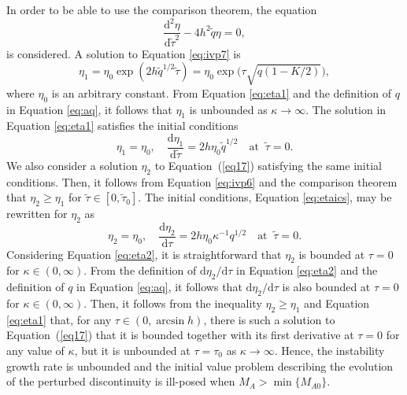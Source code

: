 In order to be able to use the comparison theorem, the equation
%
\begin{equation}
\label{eq:ivp7}
\frac{\mathrm{d}^2 \eta}{\mathrm{d}\tilde{\tau}^2} - 4h^2\tilde{q}\eta = 0, 
\end{equation}
%
is considered.
A solution to Equation \eqref{eq:ivp7} is
%
\begin{equation}
\label{eq:eta1}
\eta_1 = \eta_0\exp(2h\tilde{q}^{1/2}\tilde\tau) = 
\eta_0\exp\big(\tau\sqrt{q(1 - K/2)}\big),
\end{equation}
%
where $\eta_0$ is an arbitrary constant.
From Equation \eqref{eq:eta1} and the definition of $q$ in Equation \eqref{eq:aq}, it follows that $\eta_1$ is unbounded as $\kappa \to \infty$.
The solution in Equation \eqref{eq:eta1} satisfies the initial conditions
%
\begin{equation}
\label{eq:etaics}
\eta_1 = \eta_0, \quad \frac{\mathrm{d}\eta_1}{\mathrm{d}\tilde{\tau}} =
2h\eta_0\tilde{q}^{1/2} \quad \mbox{at} \;\; \tilde{\tau} = 0.
\end{equation}
%
We also consider a solution $\eta_2$ to Equation~(\ref{eq17}) satisfying the same initial conditions.
Then, it follows from Equation \eqref{eq:ivp6} and the comparison theorem that $\eta_2 \geq \eta_1$ for $\tilde{\tau} \in [0,\tilde{\tau}_0]$.
The initial conditions, Equation \eqref{eq:etaics}, may be rewritten for $\eta_2$ as
%
\begin{equation}
\label{eq:eta2}
\eta_2 = \eta_0, \quad \frac{\mathrm{d}\eta_2}{\mathrm{d}\tau} =
2h\eta_0\kappa^{-1} q^{1/2} \quad \mbox{at} \;\; \tilde{\tau} = 0.
\end{equation}
%
Considering Equation \eqref{eq:eta2}, it is straightforward that $\eta_2$ is bounded at $\tau = 0$ for $\kappa \in (0,\infty)$.
From the definition of $\mathrm{d}\eta_2/\mathrm{d}\tau$ in Equation \eqref{eq:eta2} and the definition of $q$ in Equation \eqref{eq:aq}, it follows that $\mathrm{d}\eta_2/\mathrm{d}\tau$ is also bounded at $\tau = 0$ for $\kappa \in (0,\infty)$.
Then, it follows from the inequality $\eta_2 \geq \eta_1$ and Equation \eqref{eq:eta1} that, for any $\tau \in (0,\arcsin h)$, there is such a solution to Equation~(\ref{eq17}) that it is bounded together with its first derivative at $\tau = 0$ for any value of $\kappa$\/, but it is unbounded at $\tau = \tau_0$ as $\kappa \to \infty$.
Hence, the instability growth rate is unbounded and the initial value problem describing the evolution of the perturbed discontinuity is ill-posed when $M_A > \min \{ M_{A0} \}$.

